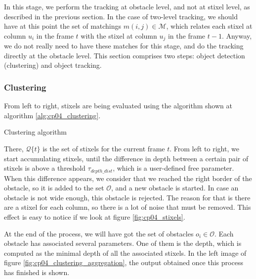 In this stage, we perform the tracking at obstacle level, and not at stixel level, as described in the previous section. In the case of two-level tracking, we should have at this point the set of matchings $m(i,j) \in \mathcal{M}$, which relates each stixel at column $u_i$ in the frame $t$ with the stixel at column $u_j$ in the frame $t - 1$. Anyway, we do not really need to have these matches for this stage, and do the tracking directly at the obstacle level. This section comprises two steps: object detection (clustering) and object tracking.

\subsubsection{Clustering}\label{ch:chapter04_01_04_01}

From left to right, stixels are being evaluated using the algorithm shown at algorithm \ref{alg:cp04_clustering}.

\begin{algorithm}
\caption{Clustering algorithm}
\label{alg:cp04_clustering}
\begin{algorithmic}
      \EndIf
    \EndIf
  \EndFor
\EndFunction
\end{algorithmic}
\end{algorithm}

There, $\mathcal{Q}\{t\}$ is the set of stixels for the current frame $t$. From left to right, we start accumulating stixels, until the difference in depth between a certain pair of stixels is above a threshold $\tau_{depth\_dist}$, which is a user-defined free parameter. When this difference appears, we consider that we reached the right border of the obstacle, so it is added to the set $\mathcal{O}$, and a new obstacle is started. In case an obstacle is not wide enough, this obstacle is rejected. The reason for that is there are a stixel for each column, so there is a lot of noise that must be removed. This effect is easy to notice if we look at figure \ref{fig:cp04_stixels}.

At the end of the process, we will have got the set of obstacles $o_i \in \mathcal{O}$. Each obstacle has associated several parameters. One of them is the depth, which is computed as the minimal depth of all the associated stixels. In the left image of figure \ref{fig:cp04_clustering_aggregation}, the output obtained once this process has finished is shown.

